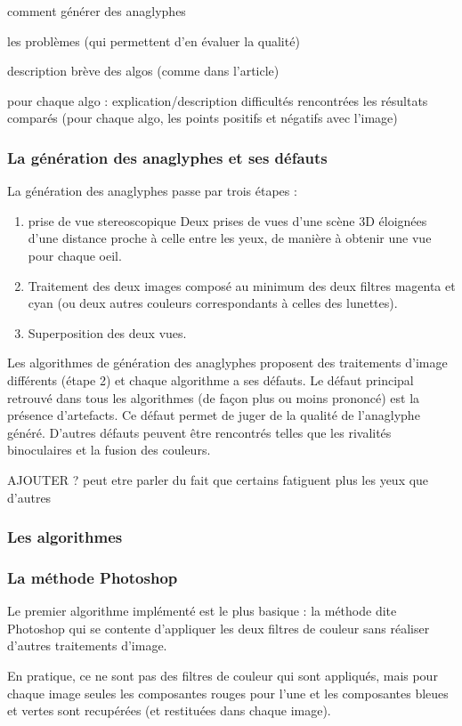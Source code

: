 comment générer des anaglyphes 

les problèmes (qui permettent d'en évaluer la qualité)

description brève des algos (comme dans l'article)

pour chaque algo : 
	explication/description
	difficultés rencontrées
 	les résultats comparés (pour chaque algo, les points positifs et négatifs avec l'image)

\subsubsection{La génération des anaglyphes et ses défauts}
La génération des anaglyphes passe par trois étapes :
	\begin{enumerate}
	\item prise de vue stereoscopique
		Deux prises de vues d'une scène 3D éloignées d'une distance proche à celle entre les yeux, de manière à obtenir une vue pour chaque oeil.
	\item 
		Traitement des deux images composé au minimum des deux filtres magenta et cyan (ou deux autres couleurs correspondants à celles des lunettes).
	\item
		Superposition des deux vues.
	\end{enumerate}
	
	Les algorithmes de génération des anaglyphes proposent des traitements d'image différents (étape 2) et chaque algorithme a ses défauts. Le défaut principal retrouvé dans tous les algorithmes (de façon plus ou moins prononcé) est la présence d'artefacts. Ce défaut permet de juger de la qualité de l'anaglyphe généré. D'autres défauts peuvent être rencontrés telles que les rivalités binoculaires et la fusion des couleurs. 
  
  AJOUTER ? peut etre parler du fait que certains fatiguent plus les yeux que d'autres
\subsubsection{Les algorithmes}

\subsubsection{La méthode Photoshop}
	Le premier algorithme implémenté est le plus basique : la méthode dite Photoshop qui se contente d'appliquer les deux filtres de couleur sans réaliser d'autres traitements d'image. 
	
	En pratique, ce ne sont pas des filtres de couleur qui sont appliqués, mais pour chaque image seules les composantes rouges pour l'une et les composantes bleues et vertes sont recupérées (et restituées dans chaque image).
	
